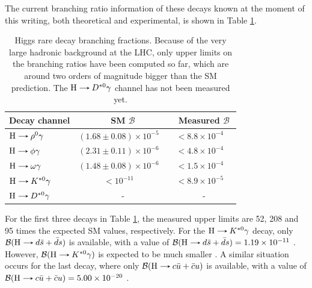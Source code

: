The current branching ratio information of these decays known at the moment of this writing, both theoretical and experimental, is shown in Table \ref{tab:Higgs_rare_decays_values}.
\begin{table}[!ht]
    \centering
    \begin{tabular}{|l|cc|cc|}
        \hline
        \multicolumn{1}{|c|}{\cellcolor{lightgray}Decay channel} & \multicolumn{2}{c|}{\cellcolor{lightgray} SM $\mathcal{B}$} & \multicolumn{2}{c|}{\cellcolor{lightgray} Measured $\mathcal{B}$} \\ \hline
        $\text{H}\decaysto \rho^0\gamma$    & $(1.68 \pm 0.08)\times 10^{-5}$    & \cite{Konig:2015qat} & $< 8.8 \times 10^{-4}$ & \cite{ATLAS:2017gko}  \\
        $\text{H}\decaysto \phi\gamma$      & $(2.31 \pm 0.11)\times 10^{-6}$    & \cite{Konig:2015qat} & $< 4.8 \times 10^{-4}$ & \cite{ATLAS:2017gko}  \\
        $\text{H}\decaysto \omega\gamma$    & $(1.48 \pm 0.08)\times 10^{-6}$    & \cite{Konig:2015qat} & $< 1.5 \times 10^{-4}$ & \cite{ATLAS:2023alf}  \\
        $\text{H}\decaysto K^{*0}\gamma$    & $< 10^{-11}$                       & \cite{ATLAS:2023alf} & $< 8.9 \times 10^{-5}$ & \cite{ATLAS:2023alf}  \\
        $\text{H}\decaysto D^{*0}\gamma$    & \multicolumn{2}{c|}{-}             & \multicolumn{2}{c|}{-}  \\ \hline
    \end{tabular}
    \caption{Higgs rare decay branching fractions. Because of the very large hadronic background at the LHC, only upper limits on the branching ratios have been computed so far, which are around two orders of magnitude bigger than the SM prediction. The $\text{H}\protect\decaysto D^{*0}\gamma$ channel has not been measured yet.}
    \label{tab:Higgs_rare_decays_values}
\end{table}
For the first three decays in Table \ref{tab:Higgs_rare_decays_values}, the measured upper limits are 52, 208 and 95 times the expected SM values, respectively. For the $\text{H}\decaysto K^{*0}\gamma$ decay, only $\mathcal{B}(\text{H}\decaysto d\bar{s} + \bar{d}s)$ is available, with a value of $\mathcal{B}(\text{H}\decaysto d\bar{s} + \bar{d}s) = 1.19\times 10^{-11}$ \cite{Aranda:2020tqw}. However, $\mathcal{B}(\text{H}\decaysto K^{*0}\gamma)$ is expected to be much smaller \cite{ATLAS:2023alf}. A similar situation occurs for the last decay, where only $\mathcal{B}(\text{H}\decaysto c\bar{u} + \bar{c}u)$ is available, with a value of $\mathcal{B}(\text{H}\decaysto c\bar{u} + \bar{c}u) = 5.00\times 10^{-20}$ \cite{Aranda:2020tqw}.


